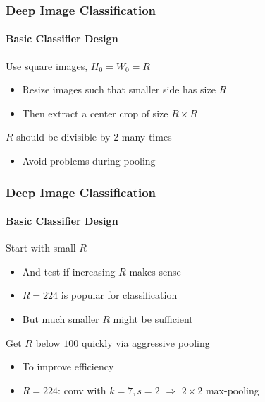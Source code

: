 \documentclass[xetex,professionalfont]{beamer}
\begin{document}
\begin{frame}
\frametitle{Deep Image Classification}
\framesubtitle{Basic Classifier Design}

Use square images, $H_0=W_0=R$ %
\begin{itemize}
    \item Resize images such that smaller side has size $R$
    \item Then extract a center crop of size $R\times R$
\end{itemize}

\bigskip

$R$ should be divisible by 2 many times
\begin{itemize}
    \item Avoid problems during pooling %
\end{itemize}

\end{frame}


\begin{frame}
\frametitle{Deep Image Classification}
\framesubtitle{Basic Classifier Design}

Start with small $R$ %
\begin{itemize}
    \item And test if increasing $R$ makes sense %
    \item $R=224$ is popular for classification %
    \item But much smaller $R$ might be sufficient %
\end{itemize}

\bigskip

Get $R$ below $100$ quickly via aggressive pooling %
\begin{itemize}
    \item To improve efficiency
    \item $R=224$: conv with $k=7,s=2$ $\Rightarrow$ $2\times2$ max-pooling %
\end{itemize}

\end{frame}
\end{document}
